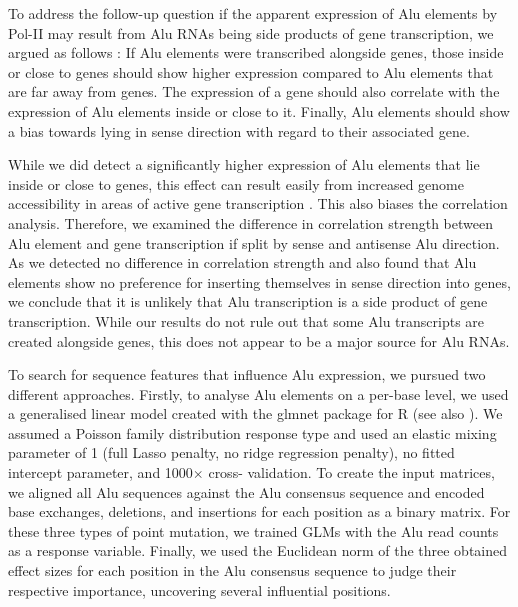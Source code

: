 \noindent To address\label{mar:alucor} the
follow-up question if the apparent expression of Alu elements by Pol-II may
result from Alu RNAs being side products of gene transcription, we argued as
follows \citep{Conti2015a,Zhang2019}: If Alu elements were transcribed
alongside genes, those inside or close to genes should show higher expression
compared to Alu elements that are far away from genes. The expression of a
gene should also correlate with the expression of Alu elements inside or close
to it. Finally, Alu elements should show a bias towards lying in sense
direction with regard to their associated gene.
\pagebreak


\noindent
While we did detect a significantly higher expression of Alu elements that lie
inside or close to genes, this effect can result easily from increased genome
accessibility in areas of active gene transcription \citep{Guo2016}. This also
biases the correlation analysis. Therefore, we examined the difference in
correlation strength between Alu element and gene transcription if split by
sense and antisense Alu direction. As we detected no difference in correlation
strength and also found that Alu elements show no preference for inserting
themselves in sense direction into genes, we conclude that it is unlikely that
Alu transcription is a side product of gene transcription. While our results
do not rule out that some Alu transcripts are created alongside genes, this
does not appear to be a major source for Alu RNAs.
\bigbreak

\noindent To search\label{mar:aluglm}
for sequence features that influence Alu expression, we pursued two different
approaches. Firstly, to analyse Alu elements on a per-base level, we used a
generalised linear model created with the glmnet package for R
\citep{Nelder1972, Friedman2010} (see also ). We
assumed a Poisson family distribution response type and used an elastic mixing
parameter \textalpha{} of \num{1} (full Lasso penalty, no ridge regression
penalty), no fitted intercept parameter, and \num{1000}$\times$ cross-%
validation. To create the input matrices, we aligned all Alu sequences against
the Alu consensus sequence and encoded base exchanges, deletions, and
insertions for each position as a binary matrix. For these three types of
point mutation, we trained GLMs with the Alu read counts as a response
variable. Finally, we used the Euclidean norm of the three obtained effect
sizes for each position in the Alu consensus sequence to judge their
respective importance, uncovering several influential positions.
\bigbreak

